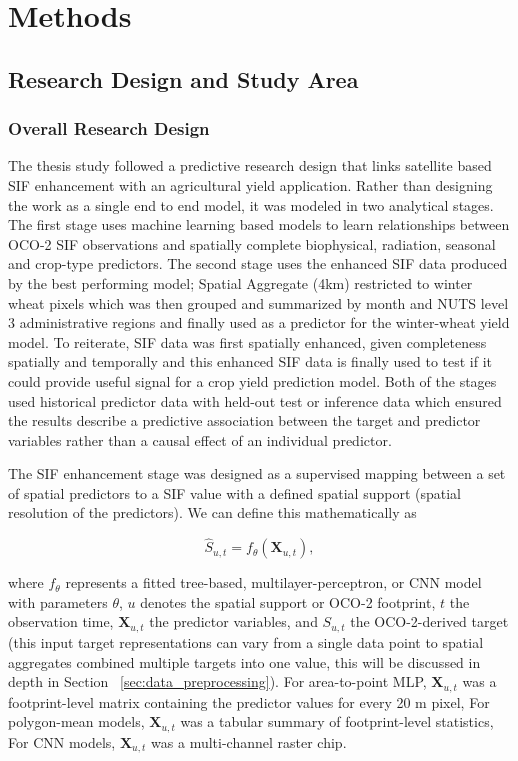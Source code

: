 \chapter{Methods\label{cha:chapter5}}

\section{Research Design and Study Area\label{sec:research_methods}}

\subsection{Overall Research Design}

The thesis study followed a predictive research design that links satellite based SIF enhancement with an agricultural yield application. Rather than designing the work as a single end to end model, it was modeled in two analytical stages. The first stage uses machine learning based models to learn relationships between OCO-2 SIF observations and spatially complete biophysical, radiation, seasonal and crop-type predictors. The second stage uses the enhanced SIF data produced by the best performing model; Spatial Aggregate (4km) restricted to winter wheat pixels which was then grouped and summarized by month and NUTS level 3 administrative regions and finally used as a predictor for the winter-wheat yield model. To reiterate, SIF data was first spatially enhanced, given completeness spatially and temporally and this enhanced SIF data is finally used to test if it could provide useful signal for a crop yield prediction model. Both of the stages used historical predictor data with held-out test or inference data which ensured the results describe a predictive association between the target and predictor variables rather than a causal effect of an individual predictor. 

The SIF enhancement stage was designed as a supervised mapping between a set of spatial predictors to a SIF value with a defined spatial support (spatial resolution of the predictors). We can define this mathematically as 

\begin{equation}
    \widehat{S}_{u,t} = f_{\theta}\!\left(\mathbf{X}_{u,t}\right),
    \label{eq:general_sif_mapping}
\end{equation}

where $f_{\theta}$ represents a fitted tree-based, multilayer-perceptron, or CNN model with parameters $\theta$, $u$ denotes the spatial support or OCO-2 footprint, $t$ the observation time, $\mathbf{X}_{u,t}$ the predictor variables, and $S_{u,t}$ the OCO-2-derived target (this input target representations can vary from a single data point to spatial aggregates combined multiple targets into one value, this will be discussed in depth in Section ~\ref{sec:data_preprocessing}). For area-to-point MLP, $\mathbf{X}_{u,t}$ was a footprint-level matrix containing the predictor values for every 20 m pixel, For polygon-mean models, $\mathbf{X}_{u,t}$ was a tabular summary of footprint-level statistics, For CNN models, $\mathbf{X}_{u,t}$ was a multi-channel raster chip.

